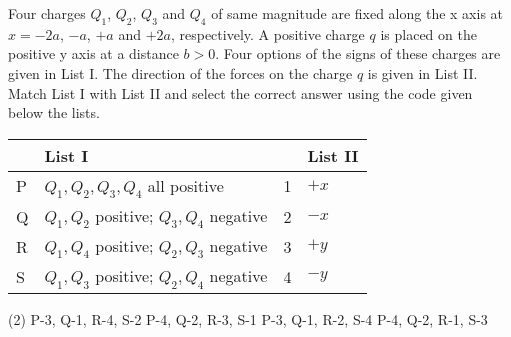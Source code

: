 
\item Four charges $Q_1$, $Q_2$, $Q_3$ and $Q_4$ of same magnitude are fixed along the x axis at $x = -2a$, $-a$, $+a$ and $+2a$, respectively. A positive charge $q$ is placed on the positive y axis at a distance $b > 0$. Four options of the signs of these charges are given in List I. The direction of the forces on the charge $q$ is given in List II. Match List I with List II and select the correct answer using the code given below the lists.

\begin{center}
\end{center}

\begin{center}
    \renewcommand{\arraystretch}{1.5}
    \begin{table}[h]
        \centering
        \begin{tabular}{p{0.25cm}p{8cm}|p{0.25cm}p{5cm}}
        \hline
        & List I & & List II \\
        \hline
        P & $Q_1, Q_2, Q_3, Q_4$ all positive & 1 & $+x$ \\
        Q & $Q_1, Q_2$ positive; $Q_3, Q_4$ negative & 2 & $-x$ \\
        R & $Q_1, Q_4$ positive; $Q_2, Q_3$ negative & 3 & $+y$ \\
        S & $Q_1, Q_3$ positive; $Q_2, Q_4$ negative & 4 & $-y$ \\
        \hline
        \end{tabular}
    \end{table}
\end{center}

\begin{tasks}(2)
    \task P-3, Q-1, R-4, S-2
    \task P-4, Q-2, R-3, S-1
    \task P-3, Q-1, R-2, S-4
    \task P-4, Q-2, R-1, S-3
\end{tasks}
